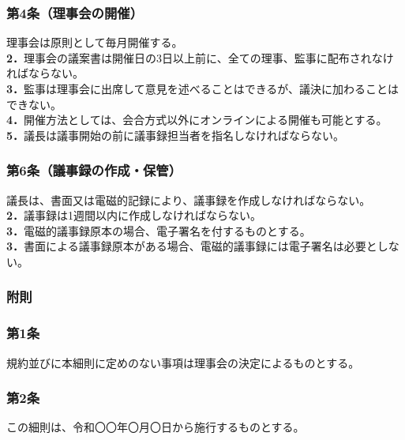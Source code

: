 \documentclass[12pt,uplatex]{jsarticle}
\begin{document}
\subsubsection*{ 第4条（理事会の開催）}
理事会は原則として毎月開催する。\\
\textbf{2．}理事会の議案書は開催日の3日以上前に、全ての理事、監事に配布されなければならない。\\
\textbf{3．}監事は理事会に出席して意見を述べることはできるが、議決に加わることはできない。\\
\textbf{4．}開催方法としては、会合方式以外にオンラインによる開催も可能とする。\\
\textbf{5．}議長は議事開始の前に議事録担当者を指名しなければならない。\\


\subsubsection*{ 第6条（議事録の作成・保管）}
議長は、書面又は電磁的記録により、議事録を作成しなければならない。\\
\textbf{2．}議事録は1週間以内に作成しなければならない。\\
\textbf{3．}電磁的議事録原本の場合、電子署名を付するものとする。\\
\textbf{3．}書面による議事録原本がある場合、電磁的議事録には電子署名は必要としない。\\


\begin{center}
\subsubsection*{附則}
\end{center}
\subsubsection*{第1条}
規約並びに本細則に定めのない事項は理事会の決定によるものとする。
\subsubsection*{第2条}
この細則は、令和〇〇年〇月〇日から施行するものとする。
\end{document}
